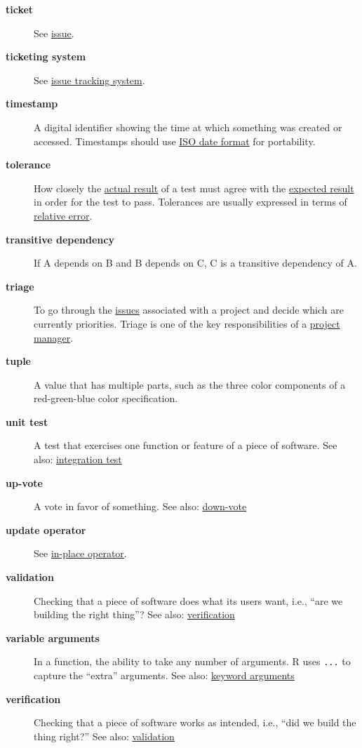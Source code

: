 \documentclass[
]{krantz}
\begin{document}
\begin{description}
\item[\textbf{ticket}]
See \protect\hyperlink{issue}{issue}.
\item[\textbf{ticketing system}]
See \protect\hyperlink{issue_tracking_system}{issue tracking system}.
\item[\textbf{timestamp}]
A digital identifier showing the time at which something was created or accessed. Timestamps should use \protect\hyperlink{iso_date_format}{ISO date format} for portability.
\item[\textbf{tolerance}]
How closely the \protect\hyperlink{actual_result}{actual result} of a test must agree with the \protect\hyperlink{expected_result}{expected result} in order for the test to pass. Tolerances are usually expressed in terms of \protect\hyperlink{relative_error}{relative error}.
\item[\textbf{transitive dependency}]
If A depends on B and B depends on C, C is a transitive dependency of A.
\item[\textbf{triage}]
To go through the \protect\hyperlink{issue}{issues} associated with a project and decide which are currently priorities. Triage is one of the key responsibilities of a \protect\hyperlink{project_manager}{project manager}.
\item[\textbf{tuple}]
A value that has multiple parts, such as the three color components of a red-green-blue color specification.
\item[\textbf{unit test}]
A test that exercises one function or feature of a piece of software. See also: \protect\hyperlink{integration_test}{integration test}
\item[\textbf{up-vote}]
A vote in favor of something. See also: \protect\hyperlink{down_vote}{down-vote}
\item[\textbf{update operator}]
See \protect\hyperlink{in_place_operator}{in-place operator}.
\item[\textbf{validation}]
Checking that a piece of software does what its users want, i.e., ``are we building the right thing''? See also: \protect\hyperlink{verification}{verification}
\item[\textbf{variable arguments}]
In a function, the ability to take any number of arguments. R uses \texttt{...} to capture the ``extra'' arguments. See also: \protect\hyperlink{keyword_arguments}{keyword arguments}
\item[\textbf{verification}]
Checking that a piece of software works as intended, i.e., ``did we build the thing right?'' See also: \protect\hyperlink{validation}{validation}

\end{description}
\end{document}
